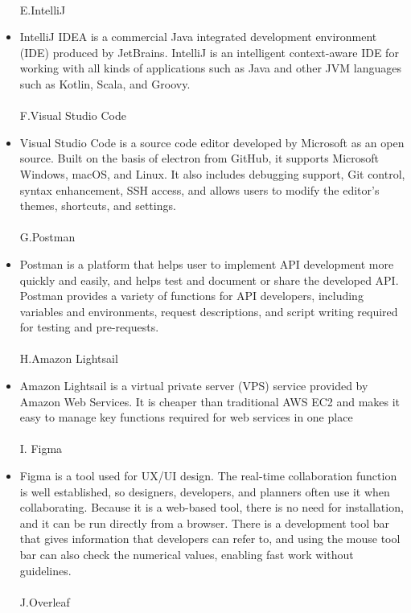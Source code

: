\documentclass[conference]{IEEEtran}
\begin{document}
\begin{itemize}
\\
E.IntelliJ\\
\item IntelliJ IDEA is a commercial Java integrated development environment (IDE) produced by JetBrains. IntelliJ is an intelligent context-aware IDE for working with all kinds of applications such as Java and other JVM languages such as Kotlin, Scala, and Groovy.\\
\\
F.Visual Studio Code\\
\item Visual Studio Code is a source code editor developed by Microsoft as an open source. Built on the basis of electron from GitHub, it supports Microsoft Windows, macOS, and Linux. It also includes debugging support, Git control, syntax enhancement, SSH access, and allows users to modify the editor's themes, shortcuts, and settings.\\
\\
G.Postman\\
\item Postman is a platform that helps user to implement API development more quickly and easily, and helps test and document or share the developed API. Postman provides a variety of functions for API developers, including variables and environments, request descriptions, and script writing required for testing and pre-requests.\\
\\
H.Amazon Lightsail\\
\item Amazon Lightsail is a virtual private server (VPS) service provided by Amazon Web Services. It is cheaper than traditional AWS EC2 and makes it easy to manage key functions required for web services in one place\\
\\
I. Figma\\
\item Figma is a tool used for UX/UI design. The real-time collaboration function is well established, so designers, developers, and planners often use it when collaborating. Because it is a web-based tool, there is no need for installation, and it can be run directly from a browser. There is a development tool bar that gives information that developers can refer to, and using the mouse tool bar can also check the numerical values, enabling fast work without guidelines.\\
\\
J.Overleaf\\

\end{itemize}
\end{document}
